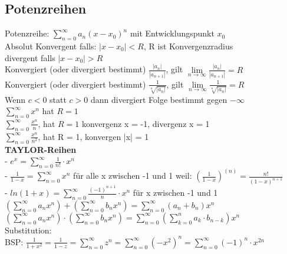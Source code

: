 \documentclass[a4paper]{scrartcl}
\begin{document}
\subsection{Potenzreihen}
Potenzreihe: $\sum\limits_{n=0}^{\infty}a_n(x-x_0)^n$ mit Entwicklungspunkt $x_0$\\
Absolut Konvergent falls: $|x - x_0| < R$, R ist Konvergenzradius\\
divergent falls $|x - x_0| > R$\\
Konvergiert (oder divergiert bestimmt) $\frac{|a_n|}{|a_{n+1}|}$, gilt $\lim\limits_{n\to\infty} \frac{|a_n|}{|a_{n+1}|} = R$ \\
Konvergiert (oder divergiert bestimmt) $\frac{1}{\sqrt[n]{|a_n|}}$, gilt $\lim\limits_{n\to\infty} \frac{1}{\sqrt[n]{|a_n|}} = R$\\
Wenn $c < 0$ statt $c > 0$ dann divergiert Folge bestimmt gegen $ -\infty$\\
$\sum\limits^{\infty}_{n=0} x^n$ hat $ R = 1$\\
$\sum\limits^{\infty}_{n=0} \frac{x^n}{n}$, hat $ R = 1$ konvergenz x = -1, divergenz x = 1\\
$\sum\limits^{\infty}_{n=0} \frac{x^n}{n^2}$, hat R = 1, konvergen |x| = 1\\
\textbf{TAYLOR-Reihen}\\
- $e^x = \sum\limits^{\infty}_{n=0} \frac{1}{n!} \cdot x^n$\\
- $\frac{1}{1-x} = \sum\limits^{\infty}_{n=0} x^n$ für alle x zwischen -1 und 1 weil: $(\frac{1}{1-x})^{(n)} = \frac{n!}{(1-x)^{n+1}}$\\
- $ln(1+x) = \sum\limits^{\infty}_{n=0} \frac{(-1)^{n+1}}{n}\cdot x^n$ für x zwischen -1 und 1\\


$(\sum\limits^{\infty}_{n=0} a_n x^n) + (\sum\limits^{\infty}_{n=0} b_n x^n) = \sum\limits^{\infty}_{n=0} (a_n + b_n) x^n$\\

$(\sum\limits^{\infty}_{n=0} a_n x^n) \cdot (\sum\limits^{\infty}_{n=0} b_n x^n) = \sum\limits^{\infty}_{n=0} (\sum\limits^n_{k=0}a_k\cdot b_{n-k}) x^n$\\
Substitution:\\
BSP: $\frac{1}{1+x^2} = \frac{1}{1-z}= \sum\limits^{\infty}_{n=0}z^n = \sum\limits^{\infty}_{n=0}(-x^2)^n = \sum\limits^{\infty}_{n=0}(-1)^n \cdot x^{2n}$\\
\end{document}
